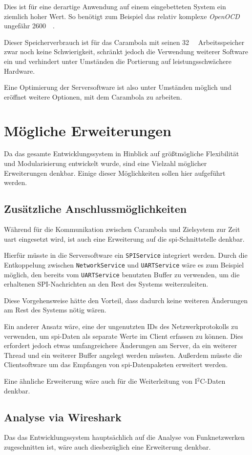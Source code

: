 Dies ist für eine derartige Anwendung auf einem eingebetteten System ein
ziemlich hoher Wert. So benötigt zum Beispiel das relativ komplexe
\emph{OpenOCD} ungefähr \SI{2600}{\kilo\byte}.

Dieser Speicherverbrauch ist für das Carambola mit seinen \SI{32}{\mega\byte}
Arbeitsspeicher zwar noch keine Schwierigkeit, schränkt jedoch die Verwendung
weiterer Software ein und verhindert unter Umständen die Portierung auf
leistungsschwächere Hardware.

Eine Optimierung der Serversoftware ist also unter Umständen möglich und
eröffnet weitere Optionen, mit dem Carambola zu arbeiten.
\section{Mögliche Erweiterungen}
Da das gesamte Entwicklungssystem in Hinblick auf größtmögliche Flexibilität und
Modularisierung entwickelt wurde, sind eine Vielzahl möglicher Erweiterungen
denkbar. Einige dieser Möglichkeiten sollen hier aufgeführt werden.
\subsection{Zusätzliche Anschlussmöglichkeiten}
Während für die Kommunikation zwischen Carambola und Zielsystem zur Zeit
\gls{uart} eingesetzt wird, ist auch eine Erweiterung auf die
\gls{spi}-Schnittstelle denkbar.

Hierfür müsste in die Serversoftware ein \texttt{SPIService} integriert werden.
Durch die Entkoppelung zwischen \texttt{NetworkService} und
\texttt{UARTService} wäre es zum Beispiel möglich, den bereits vom
\texttt{UARTService} benutzten Buffer zu verwenden, um die erhaltenen
SPI-Nachrichten an den Rest des Systems weiterzuleiten.

Diese Vorgehensweise hätte den Vorteil, dass dadurch keine weiteren
Änderungen am Rest des Systems nötig wären.

Ein anderer Ansatz wäre, eine der ungenutzten IDs des Netzwerkprotokolls zu
verwenden, um \gls{spi}-Daten als separate Werte im Client erfassen zu
können. Dies erfordert jedoch etwas umfangreichere Änderungen am Server, da ein
weiterer Thread und ein weiterer Buffer angelegt werden müssten. Außerdem müsste
die Clientsoftware um das Empfangen von \gls{spi}-Datenpaketen erweitert werden.

Eine ähnliche Erweiterung wäre auch für die Weiterleitung von I$^2$C-Daten
denkbar.
\subsection{Analyse via Wireshark}
Das das Entwicklungssystem hauptsächlich auf die Analyse von Funknetzwerken
zugeschnitten ist, wäre auch diesbezüglich eine Erweiterung denkbar.

